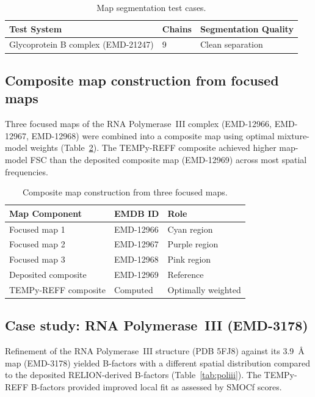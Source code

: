 \documentclass[11pt,a4paper]{article}
\begin{document}
\begin{table}[htbp]
\centering
\caption{Map segmentation test cases.}
\label{tab:segmentation}
\begin{tabular}{lll}
\toprule
\textbf{Test System} & \textbf{Chains} & \textbf{Segmentation Quality} \\
\midrule
Glycoprotein B complex (EMD-21247) & 9 & Clean separation \\
\bottomrule
\end{tabular}
\end{table}

\subsection{Composite map construction from focused maps}

Three focused maps of the RNA Polymerase~III complex (EMD-12966, EMD-12967, EMD-12968) were combined into a composite map using optimal mixture-model weights (Table~\ref{tab:composite}). The TEMPy-REFF composite achieved higher map-model FSC than the deposited composite map (EMD-12969) across most spatial frequencies.

\begin{table}[htbp]
\centering
\caption{Composite map construction from three focused maps.}
\label{tab:composite}
\begin{tabular}{lll}
\toprule
\textbf{Map Component} & \textbf{EMDB ID} & \textbf{Role} \\
\midrule
Focused map 1 & EMD-12966 & Cyan region \\
Focused map 2 & EMD-12967 & Purple region \\
Focused map 3 & EMD-12968 & Pink region \\
Deposited composite & EMD-12969 & Reference \\
TEMPy-REFF composite & Computed & Optimally weighted \\
\bottomrule
\end{tabular}
\end{table}

\subsection{Case study: RNA Polymerase~III (EMD-3178)}

Refinement of the RNA Polymerase~III structure (PDB 5FJ8) against its 3.9~\AA{} map (EMD-3178) yielded B-factors with a different spatial distribution compared to the deposited RELION-derived B-factors (Table~\ref{tab:poliii}). The TEMPy-REFF B-factors provided improved local fit as assessed by SMOCf scores.
\end{document}
